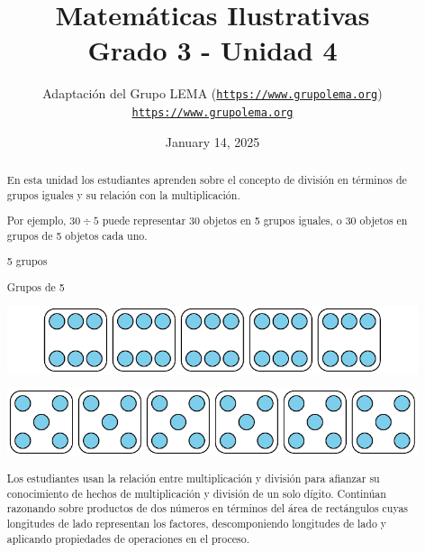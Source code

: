 \documentclass[oneside,10pt,]{article}
\title{Matemáticas Ilustrativas\\
{\large Grado 3 - Unidad 4}}
\author{Adaptación del Grupo LEMA (\href{https://www.grupolema.org}{\nolinkurl{https://www.grupolema.org}})\\
\href{https://www.grupolema.org}{\nolinkurl{https://www.grupolema.org}}
}
\date{January 14, 2025}
\begin{document}
\raggedbottom
\hypertarget{gra3-uni4}{}
\maketitle
\thispagestyle{empty}
\renewcommand*{\abstractname}{Resumen}
\begin{abstract}
En esta unidad los estudiantes aprenden sobre el concepto de división en términos de grupos iguales y su relación con la multiplicación.%
 \par
Por ejemplo, \(30\div 5\) puede representar 30 objetos en 5 grupos iguales, o 30 objetos en grupos de 5 objetos cada uno.%
 \begin{sidebyside}{2}{0.025}{0.025}{0.05}%
\begin{sbspanel}{0.45}%
5 grupos%
\end{sbspanel}%
\begin{sbspanel}{0.45}%
\par
Grupos de 5%
\end{sbspanel}%
\end{sidebyside}%
\begin{sidebyside}{2}{0.025}{0.025}{0.05}%
\begin{sbspanel}{0.45}%
\includegraphics[width=\linewidth]{external/svg-source/tikz-file-147473.pdf}
\end{sbspanel}%
\begin{sbspanel}{0.45}%
\includegraphics[width=\linewidth]{external/svg-source/tikz-file-147472.pdf}
\end{sbspanel}%
\end{sidebyside}%
 Los estudiantes usan la relación entre multiplicación y división para afianzar su conocimiento de hechos de multiplicación y división de un solo dígito. Continúan razonando sobre productos de dos números en términos del área de rectángulos cuyas longitudes de lado representan los factores, descomponiendo longitudes de lado y aplicando propiedades de operaciones en el proceso.%

\end{abstract}
\end{document}

